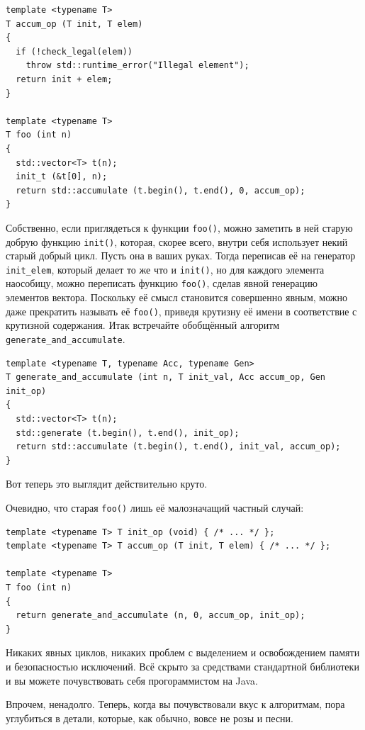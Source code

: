 \documentclass[a4paper,12pt,oneside]{article}
\begin{document}
\begin{lstlisting}
template <typename T>
T accum_op (T init, T elem)
{
  if (!check_legal(elem))
    throw std::runtime_error("Illegal element");
  return init + elem;
}

template <typename T>
T foo (int n)
{
  std::vector<T> t(n);
  init_t (&t[0], n);
  return std::accumulate (t.begin(), t.end(), 0, accum_op);
}
\end{lstlisting}

Собственно, если приглядеться к функции \lstinline!foo()!, можно заметить в ней старую добрую функцию \lstinline!init()!, которая, скорее всего, внутри себя использует некий старый добрый цикл. Пусть она в ваших руках. Тогда переписав её на генератор \lstinline!init_elem!, который делает то же что и \lstinline!init()!, но для каждого элемента наособицу, можно переписать функцию \lstinline!foo()!, сделав явной генерацию элементов вектора. Поскольку её смысл становится совершенно явным, можно даже прекратить называть её \lstinline!foo()!, приведя крутизну её имени в соответствие с крутизной содержания. Итак встречайте обобщённый алгоритм \lstinline!generate_and_accumulate!.

\begin{lstlisting}
template <typename T, typename Acc, typename Gen>
T generate_and_accumulate (int n, T init_val, Acc accum_op, Gen init_op)
{
  std::vector<T> t(n);
  std::generate (t.begin(), t.end(), init_op);
  return std::accumulate (t.begin(), t.end(), init_val, accum_op);
}
\end{lstlisting}

Вот теперь это выглядит действительно круто.

Очевидно, что старая \lstinline!foo()! лишь её малозначащий частный случай:

\begin{lstlisting}
template <typename T> T init_op (void) { /* ... */ };
template <typename T> T accum_op (T init, T elem) { /* ... */ };

template <typename T> 
T foo (int n)
{
  return generate_and_accumulate (n, 0, accum_op, init_op);
}
\end{lstlisting}

Никаких явных циклов, никаких проблем с выделением и освобождением памяти и безопасностью исключений. Всё скрыто за средствами стандартной библиотеки и вы можете почувствовать себя прогораммистом на Java.

Впрочем, ненадолго. Теперь, когда вы почувствовали вкус к алгоритмам, пора углубиться в детали, которые, как обычно, вовсе не розы и песни.
\end{document}
